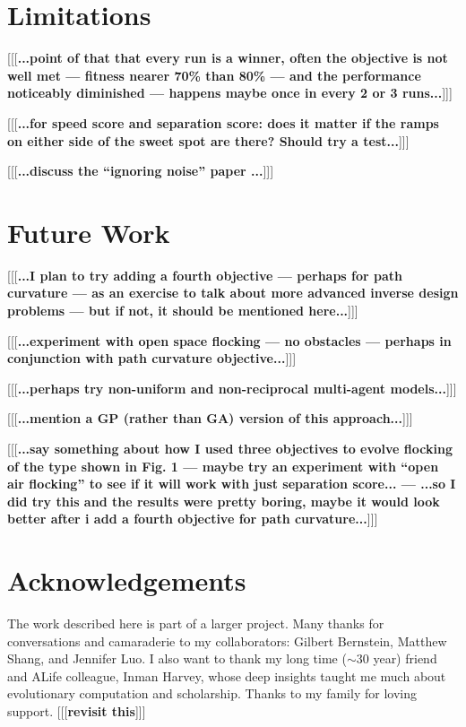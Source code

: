 \documentclass[letterpaper]{article}
\begin{document}
\section{Limitations}
\label{sec:limitations}

[[[\textbf{...point of that that every run is a winner, often the objective is not well met --- fitness nearer 70\% than 80\% --- and the performance noticeably diminished --- happens maybe once in every 2 or 3 runs...}]]]

[[[\textbf{...for speed score and separation score: does it matter if the ramps on either side of the sweet spot are there? Should try a test...}]]]

[[[\textbf{...discuss the ``ignoring noise'' paper \citep{antipov_evolutionary_2025}...}]]]

\section{Future Work}
\label{sec:future}

[[[\textbf{...I plan to try adding a fourth objective --- perhaps for path curvature --- as an exercise to talk about more advanced inverse design problems --- but if not, it should be mentioned here...}]]]

[[[\textbf{...experiment with open space flocking --- no obstacles --- perhaps in conjunction with path curvature objective...}]]]

[[[\textbf{...perhaps try non-uniform \citep{montanari_optimal_2025} and non-reciprocal \citep{choi_flocking_2025} multi-agent models...}]]]

[[[\textbf{...mention a GP (rather than GA) version of this approach...}]]]

[[[\textbf{...say something about how I used three objectives to evolve flocking of the type shown in Fig. 1 --- maybe try an experiment with ``open air flocking'' to see if it will work with just separation score... --- ...so I did try this and the results were pretty boring, maybe it would look better after i add a fourth objective for path curvature...}]]]

\section{Acknowledgements}
\label{sec:ack}

The work described here is part of a larger project. Many thanks for conversations and camaraderie to my collaborators: Gilbert Bernstein, Matthew Shang, and Jennifer Luo. I also want to thank my long time ($\sim$30 year) friend and ALife colleague, Inman Harvey, whose deep insights taught me much about evolutionary computation and scholarship. Thanks to my family for loving support. [[[\textbf{revisit this}]]]






\end{document}
